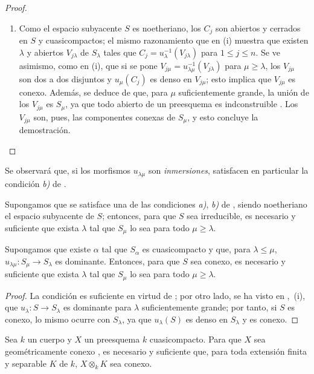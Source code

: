 \begin{proof}
\begin{enumerate}[label=(\roman*)]
  \item Como el espacio subyacente $S$ es noetheriano, los $C_j$ son abiertos y cerrados en $S$ y cuasicompactos; el mismo razonamiento que en (i) muestra que existen $\lambda$ y abiertos $V_{j\lambda}$ de $S_\lambda$ tales que $C_j=u_\lambda^{-1}(V_{j\lambda})$ para $1\leq j\leq n$.
Se ve asimismo, como en (i), que si se pone $V_{j\mu}=u_{\lambda\mu}^{-1}(V_{j\lambda})$ para $\mu\geq\lambda$, los $V_{j\mu}$ son dos a dos disjuntos y $u_\mu(C_j)$ es denso en $V_{j\mu}$; esto implica que $V_{j\mu}$ es conexo.
Además, se deduce de  que, para $\mu$ suficientemente grande, la unión de los $V_{j\mu}$ es $S_\mu$, ya que todo abierto de un preesquema es indconstruible .
Los $V_{j\mu}$ son, pues, las componentes conexas de $S_\mu$, y esto concluye la demostración.
\end{enumerate}
\end{proof}

Se observará que, si los morfismos $u_{\lambda\mu}$ son \emph{inmersiones}, satisfacen en particular la condición \emph{b)} de .

\begin{corollary}[8.4.3]
\label{IV.8.4.3-fr}
Supongamos que se satisface una de las condiciones \emph{a)}, \emph{b)} de , siendo noetheriano el espacio subyacente de $S$; entonces, para que $S$ sea irreducible, es necesario y suficiente que exista $\lambda$ tal que $S_\mu$ lo sea para todo $\mu\geq\lambda$.
\end{corollary}

\begin{proposition}[8.4.4]
\label{IV.8.4.4-fr}
Supongamos que existe $\alpha$ tal que $S_\alpha$ es cuasicompacto y que, para $\lambda\leq\mu$, $u_{\lambda\mu}:S_\mu\to S_\lambda$ es dominante.
Entonces, para que $S$ sea conexo, es necesario y suficiente que exista $\lambda$ tal que $S_\mu$ lo sea para todo $\mu\geq\lambda$.
\end{proposition}

\begin{proof}
La condición es suficiente en virtud de ; por otro lado, se ha visto en ,~(i), que $u_\lambda:S\to S_\lambda$ es dominante para $\lambda$ suficientemente grande; por tanto, si $S$ es conexo, lo mismo ocurre con $S_\lambda$, ya que $u_\lambda(S)$ es denso en $S_\lambda$ y es conexo.
\end{proof}

\begin{corollary}[8.4.5]
\label{IV.8.4.5-fr}
Sea $k$ un cuerpo y $X$ un preesquema $k$ cuasicompacto.
Para que $X$ sea geométricamente conexo , es necesario y suficiente que, para toda extensión finita y separable $K$ de $k$, $X\otimes_k K$ sea conexo.
\end{corollary}

